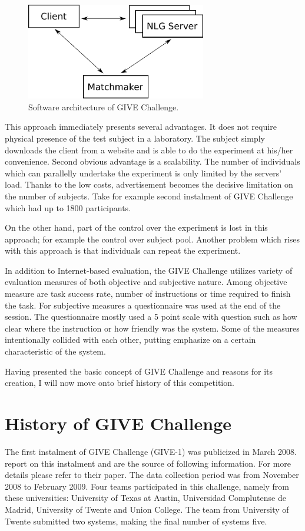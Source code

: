 \begin{figure}[h]
  \centering
	\includegraphics[width=0.7\textwidth]{Images/give-client-servers}
	\caption{Software architecture of GIVE Challenge.}
	\label{fig:give-clientserver}
\end{figure}

This approach immediately presents several advantages. It does not require physical presence of the test subject in a laboratory. The subject simply downloads the client from a website and is able to do the experiment at his/her convenience. Second obvious advantage is a scalability. The number of individuals which can parallelly undertake the experiment is only limited by the servers' load. Thanks to the low costs, advertisement becomes the decisive limitation on the number of subjects. Take for example second instalment of GIVE Challenge which had up to 1800 participants.

On the other hand, part of the control over the experiment is lost in this approach; for example the control over subject pool. Another problem which rises with this approach is that individuals can repeat the experiment.

In addition to Internet-based evaluation, the GIVE Challenge utilizes variety of evaluation measures of both objective and subjective nature. Among objective measure are task success rate, number of instructions or time required to finish the task. For subjective measures a questionnaire was used at the end of the session. The questionnaire mostly used a 5 point scale with question such as how clear where the instruction or how friendly was the system. Some of the measures intentionally collided with each other, putting emphasize on a certain characteristic of the system.

Having presented the basic concept of GIVE Challenge and reasons for its creation, I will now move onto brief history of this competition. 

 
\section{History of GIVE Challenge}
The first instalment of GIVE Challenge (GIVE-1) was publicized in March 2008. \citet{koller2010first} report on this instalment and are the source of following information. For more details please refer to their paper. The data collection period was from November 2008 to February 2009. Four teams participated in this challenge, namely from these universities: University of Texas at Austin, Universidad Complutense de Madrid, University of Twente and Union College. The team from University of Twente submitted two systems, making the final number of systems five.

